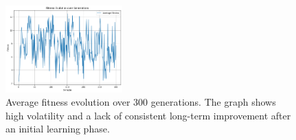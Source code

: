 \documentclass[final,5p,times,twocolumn,authoryear]{elsarticle}
\begin{document}
\begin{figure}[H]
    \centering
    \includegraphics[width=0.4\textwidth]{figures/ANN_Simple_MutationVariable.png}
    \caption{Average fitness evolution over 300 generations. The graph shows high volatility and a lack of consistent long-term improvement after an initial learning phase.}
    \label{fig:ANN_full}
\end{figure}
\end{document}
